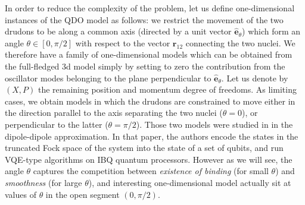 \documentclass[reprint, amsmath, amssymb, aps, pra]{revtex4-2}
\begin{document}
        In order to reduce the complexity of the problem, let us define one-dimensional instances of the QDO model as follows: we restrict the movement of the two drudons to be along a common axis (directed by a unit vector $\hat{\bm e}_\theta$) which form an angle $\theta\in[0,\pi/2]$ with respect to the vector $\bm r_{12}$ connecting the two nuclei. We therefore have a family of one-dimensional models which can be obtained from the full-fledged 3d model simply by setting to zero the contribution from the oscillator modes belonging to the plane perpendicular to $\hat{\bm e}_\theta$. Let us denote by $(X, P)$ the remaining position and momentum degree of freedoms. As limiting cases, we obtain models in which the drudons are constrained to move either in the direction parallel to the axis separating the two nuclei ($\theta=0$), or perpendicular to the latter ($\theta=\pi/2$). Those two models were studied in \cite{anderson2022coarse} in the dipole-dipole approximation. In that paper, the authors encode the states in the truncated Fock space of the system into the state of a set of qubits, and run VQE-type algorithms on IBQ quantum processors. However as we will see, the angle $\theta$ captures the competition between \textit{existence of binding} (for small $\theta$) and \textit{smoothness} (for large $\theta$), and interesting one-dimensional model actually sit at values of $\theta$ in the open segment $(0,\pi/2)$.
\end{document}
